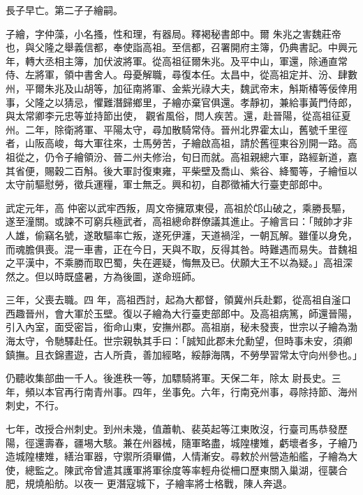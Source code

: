 \begin{pinyinscope}
 長子早亡。第二子子繪嗣。



 子繪，字仲藻，小名搔，性和理，有器局。釋褐秘書郎中。爾
 朱兆之害魏莊帝也，與父隆之舉義信都，奉使詣高祖。至信都，召署開府主簿，仍典書記。中興元年，轉大丞相主簿，加伏波將軍。從高祖征爾朱兆。及平中山，軍還，除通直常侍、左將軍，領中書舍人。母憂解職，尋復本任。太昌中，從高祖定并、汾、肆數州，平爾朱兆及山胡等，加征南將軍、金紫光祿大夫，魏武帝末，斛斯椿等佞倖用事，父隆之以猜忌，懼難潛歸鄉里，子繪亦棄官俱還。孝靜初，兼給事黃門侍郎，與太常卿李元忠等並持節出使，
 觀省風俗，問人疾苦。還，赴晉陽，從高祖征夏州。二年，除衛將軍、平陽太守，尋加散騎常侍。晉州北界霍太山，舊號千里徑者，山阪高峻，每大軍往來，士馬勞苦，子繪啟高祖，請於舊徑東谷別開一路。高祖從之，仍令子繪領汾、晉二州夫修治，旬日而就。高祖親總六軍，路經新道，嘉其省便，賜穀二百斛。後大軍討復東雍，平柴壁及喬山、紫谷、絳蜀等，子繪恒以太守前驅慰勞，徵兵運糧，軍士無乏。興和初，自郡徵補大行臺吏部郎中。



 武定元年，高
 仲密以武牢西叛，周文帝擁眾東侵，高祖於邙山破之，乘勝長驅，遂至潼關。或諫不可窮兵極武者，高祖總命群僚議其進止。子繪言曰：「賊帥才非人雄，偷竊名號，遂敢驅率亡叛，遂死伊瀍，天道禍淫，一朝瓦解。雖僅以身免，而魂膽俱喪。混一車書，正在今日，天與不取，反得其咎。時難遇而易失。昔魏祖之平漢中，不乘勝而取巴蜀，失在遲疑，悔無及已。伏願大王不以為疑。」高祖深然之。但以時既盛暑，方為後圖，遂命班師。



 三年，父喪去職。四
 年，高祖西討，起為大都督，領冀州兵赴鄴，從高祖自滏口西趣晉州，會大軍於玉壁。復以子繪為大行臺吏部郎中。及高祖病篤，師還晉陽，引入內室，面受密旨，銜命山東，安撫州郡。高祖崩，秘未發喪，世宗以子繪為渤海太守，令馳驛赴任。世宗親執其手曰：「誠知此郡未允勳望，但時事未安，須卿鎮撫。且衣錦晝遊，古人所貴，善加經略，綏靜海隅，不勞學習常太守向州參也。」



 仍聽收集部曲一千人。後進秩一等，加驃騎將軍。天保二年，除太
 尉長史。三年，頻以本官再行南青州事。四年，坐事免。六年，行南兗州事，尋除持節、海州刺史，不行。



 七年，改授合州刺史。到州未幾，值蕭軌、裴英起等江東敗沒，行臺司馬恭發歷陽，徑還壽春，疆埸大駭。兼在州器械，隨軍略盡，城隍樓雉，虧壞者多，子繪乃造城隍樓雉，繕治軍器，守禦所須畢備，人情漸安。尋敕於州營造船艦，子繪為大使，總監之。陳武帝曾遣其護軍將軍徐度等率輕舟從柵口歷東關入巢湖，徑襲合肥，規燒船舫。以夜一
 更潛寇城下，子繪率將士格戰，陳人奔退。




\end{pinyinscope}
